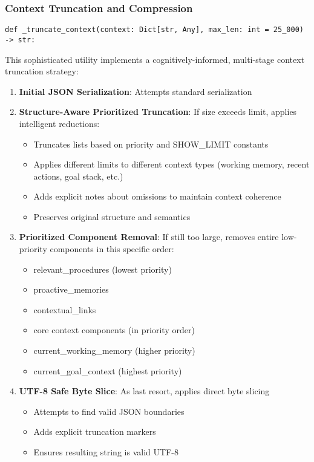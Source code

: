 \documentclass[12pt,a4paper]{article}
\begin{document}
\subsubsection*{Context Truncation and Compression}
\begin{pageablecode}
\begin{verbatim}
def _truncate_context(context: Dict[str, Any], max_len: int = 25_000) -> str:
\end{verbatim}
\end{pageablecode}
This sophisticated utility implements a cognitively-informed, multi-stage context truncation strategy:

\begin{enumerate}[label=\arabic*.]
    \item \textbf{Initial JSON Serialization}: Attempts standard serialization
    \item \textbf{Structure-Aware Prioritized Truncation}: If size exceeds limit, applies intelligent reductions:
    \begin{itemize}
        \item Truncates lists based on priority and SHOW\_LIMIT constants
        \item Applies different limits to different context types (working memory, recent actions, goal stack, etc.)
        \item Adds explicit notes about omissions to maintain context coherence
        \item Preserves original structure and semantics
    \end{itemize}
    \item \textbf{Prioritized Component Removal}: If still too large, removes entire low-priority components in this specific order:
    \begin{itemize}
        \item relevant\_procedures (lowest priority)
        \item proactive\_memories
        \item contextual\_links
        \item core context components (in priority order)
        \item current\_working\_memory (higher priority)
        \item current\_goal\_context (highest priority)
    \end{itemize}
    \item \textbf{UTF-8 Safe Byte Slice}: As last resort, applies direct byte slicing
    \begin{itemize}
        \item Attempts to find valid JSON boundaries
        \item Adds explicit truncation markers
        \item Ensures resulting string is valid UTF-8
    \end{itemize}
\end{enumerate}
\end{document}
